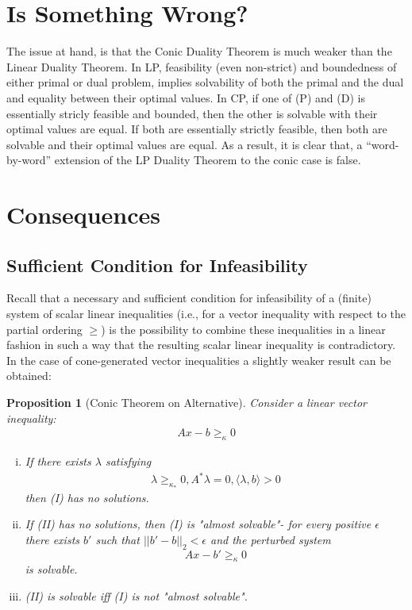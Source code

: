 \documentclass[12pt]{article}
\newtheorem*{proposition}{Proposition}
\begin{document}
   \section{Is Something Wrong?}
   The issue at hand, is that the Conic Duality Theorem is much weaker than the Linear Duality Theorem. In LP, feasibility (even non-strict) and boundedness of either primal or dual problem, implies solvability of both the primal and the dual and equality between their optimal values. In CP, if one of (P) and (D) is essentially stricly feasible and bounded, then the other is solvable with their optimal values are equal. If both are essentially strictly feasible, then both are solvable and their optimal values are equal. As a result, it is clear that, a “word-by-word” extension of the LP Duality Theorem to the conic case is false.

   \section{Consequences}
   \subsection{Sufficient Condition for Infeasibility}
   Recall that a necessary and sufficient condition for infeasibility of a (finite) system of scalar linear inequalities (i.e., for a vector inequality with respect to the partial ordering $\geq$) is the possibility to combine these inequalities in a linear fashion in such a way that the resulting scalar linear inequality is contradictory. In the case of cone-generated vector inequalities a slightly weaker result can be obtained: \newpage
   \begin{proposition}
   [Conic Theorem on Alternative] Consider a linear vector inequality:
   \begin{align*}
       Ax - b \geq_\kappa 0 
       \tag{I}
   \end{align*}
   \begin{enumerate}[i.]
   \item If there exists $\lambda$ satisfying 
   \begin{align*}
       \lambda \geq_{\kappa_{*}} 0, A^* \lambda = 0, \langle \lambda, b \rangle > 0
       \tag{II}
   \end{align*} 
   then (I) has no solutions.
   \item If (II) has no solutions, then (I) is "almost solvable"- for every positive $\epsilon$ there exists $b'$ such that $||b' - b||_2 < \epsilon$ and the perturbed system
   $$Ax - b' \geq_\kappa 0$$ is solvable. 
   \item (II) is solvable iff (I) is not "almost solvable".
   \end{enumerate}
   \end{proposition}
   
\end{document}
